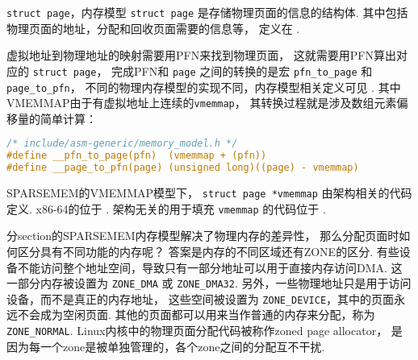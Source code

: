 \begin{readsrcbox}{\lstinline{struct page}，内存模型}
	\lstinline{struct page} 是存储物理页面的信息的结构体.
	其中包括物理页面的地址，分配和回收页面需要的信息等，
	定义在 .

	虚拟地址到物理地址的映射需要用PFN来找到物理页面，
	这就需要用PFN算出对应的 \lstinline{struct page}，
	完成PFN和 \lstinline{page} 之间的转换的是宏
	\lstinline{pfn_to_page} 和 \lstinline{page_to_pfn}，
	不同的物理内存模型的实现不同，内存模型相关定义可见
	.
	其中VMEMMAP由于有虚拟地址上连续的\lstinline{vmemmap}，
	其转换过程就是涉及数组元素偏移量的简单计算：
	\begin{lstlisting}[language=C]
/* include/asm-generic/memory_model.h */
#define __pfn_to_page(pfn)	(vmemmap + (pfn))
#define __page_to_pfn(page)	(unsigned long)((page) - vmemmap)
\end{lstlisting}

	SPARSEMEM的VMEMMAP模型下，
	\lstinline{struct page *vmemmap} 由架构相关的代码定义.
	x86-64的位于 .
	架构无关的用于填充 \lstinline{vmemmap} 的代码位于
	.
\end{readsrcbox}

分section的SPARSEMEM内存模型解决了物理内存的差异性，
那么分配页面时如何区分具有不同功能的内存呢？
答案是内存的不同区域还有ZONE的区分.
有些设备不能访问整个地址空间，导致只有一部分地址可以用于直接内存访问DMA.
这一部分内存被设置为 \lstinline{ZONE_DMA} 或 \lstinline{ZONE_DMA32}.
另外，一些物理地址只是用于访问设备，而不是真正的内存地址，
这些空间被设置为 \lstinline{ZONE_DEVICE}，其中的页面永远不会成为空闲页面.
其他的页面都可以用来当作普通的内存来分配，称为 \lstinline{ZONE_NORMAL}.
Linux内核中的物理页面分配代码被称作zoned page allocator，
是因为每一个zone是被单独管理的，各个zone之间的分配互不干扰.



